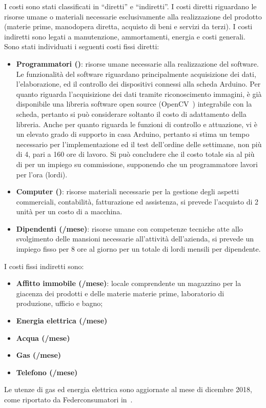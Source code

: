 I costi sono stati classificati in “diretti” e “indiretti”. I costi diretti
riguardano le risorse umane o materiali necessarie esclusivamente alla
realizzazione del prodotto (materie prime, manodopera diretta, acquisto di beni
e servizi da terzi). I costi indiretti sono legati a manutenzione, ammortamenti,
energia e costi generali.\\
%
Sono stati individuati i seguenti costi fissi diretti:
\begin{itemize}
\item \textbf{Programmatori ()}: risorse umane necessarie alla
realizzazione del software.  Le funzionalità del software riguardano
principalmente acquisizione dei dati, l’elaborazione, ed il controllo dei
dispositivi connessi alla scheda Arduino.  Per quanto riguarda l’acquisizione
dei dati tramite riconoscimento immagini, è già disponibile una libreria
software open source (OpenCV~\cite{opencv}) integrabile con la scheda, pertanto
si può considerare soltanto il costo di adattamento della libreria. Anche per
quanto riguarda le funzioni di controllo e attuazione, vi è un elevato grado di
supporto in casa Arduino, pertanto si stima un tempo necessario per
l’implementazione ed il test dell’ordine delle settimane, non più di 4, pari a
160 ore di lavoro. Si può concludere che il costo totale sia al più di
 per un impiego su commissione, supponendo che un programmatore lavori
per  l’ora (lordi).  
\item \textbf{Computer ()}: risorse materiali
necessarie per la gestione degli aspetti commerciali, contabilità, fatturazione
ed assistenza, si prevede l’acquisto di 2 unità per un costo di  a
macchina.  
\item \textbf{Dipendenti (/mese)}: risorse umane con competenze
tecniche atte allo svolgimento delle mansioni necessarie all’attività
dell’azienda, si prevede un impiego fisso per 8 ore al giorno per un totale di
 lordi mensili per dipendente.  
\end{itemize}
%
I costi fissi indiretti sono: 
\begin{itemize}
\item \textbf{Affitto immobile (/mese)}: locale comprendente un
magazzino per la giacenza dei prodotti e delle materie materie prime,
laboratorio di produzione, ufficio e bagno;
\item \textbf{Energia elettrica (/mese)}
\item \textbf{Acqua (/mese)}
\item \textbf{Gas (/mese)}
\item \textbf{Telefono (/mese)}
\end{itemize}
%
Le utenze di gas ed energia elettrica sono aggiornate al mese di dicembre 2018,
come riportato da Federconsumatori in~\cite{feder}.

